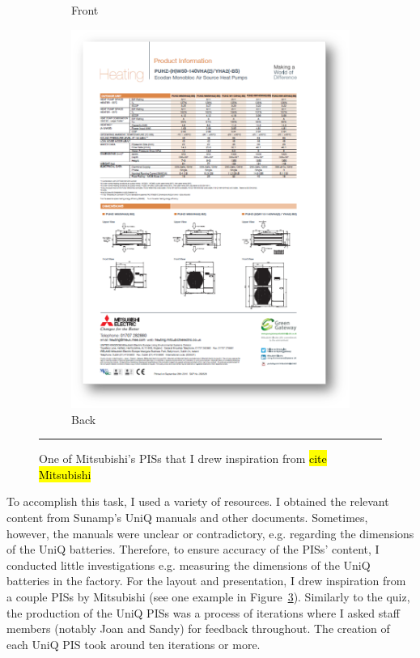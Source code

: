 \begin{figure}
\begin{subfigure}{.19\textwidth}
		\caption{Front}
		\label{mitsubishi01}
	\end{subfigure}
	\begin{subfigure}{.19\textwidth}
		\centering
		\includegraphics[width=\textwidth]{figures/Mitsubishi02.png}
		\caption{Back}
		\label{mitsubishi02}
	\end{subfigure}
	\rule{0.4\textwidth}{0.5pt} %
	\caption[Mitsubishi's PISs.]{One of Mitsubishi's PISs that I drew inspiration from \hl{cite Mitsubishi}
	}
	\label{mitsubishi}
\end{figure}

To accomplish this task, I used a variety of resources.
I obtained the relevant content from Sunamp's UniQ manuals and other documents.
Sometimes, however, the manuals were unclear or contradictory, e.g. regarding the dimensions of the UniQ batteries.
Therefore, to ensure accuracy of the PISs' content, I conducted little investigations e.g. measuring the dimensions of the UniQ batteries in the factory.
For the layout and presentation, I drew inspiration from a couple PISs by Mitsubishi (see one example in Figure~\ref{mitsubishi}).
Similarly to the quiz, the production of the UniQ PISs was a process of iterations where I asked staff members (notably Joan and Sandy) for feedback throughout.
The creation of each UniQ PIS took around ten iterations or more.


